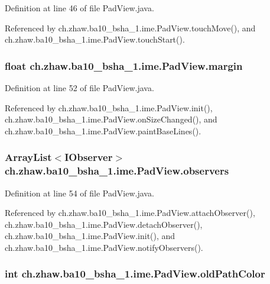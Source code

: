 Definition at line 46 of file PadView.java.

Referenced by ch.zhaw.ba10\_\-bsha\_\-1.ime.PadView.touchMove(), and ch.zhaw.ba10\_\-bsha\_\-1.ime.PadView.touchStart().\hypertarget{classch_1_1zhaw_1_1ba10__bsha__1_1_1ime_1_1PadView_af25e748299c5bc4816c615f180306695}{
\subsubsection[{margin}]{\setlength{\rightskip}{0pt plus 5cm}float {\bf ch.zhaw.ba10\_\-bsha\_\-1.ime.PadView.margin}}}
\label{classch_1_1zhaw_1_1ba10__bsha__1_1_1ime_1_1PadView_af25e748299c5bc4816c615f180306695}


Definition at line 52 of file PadView.java.

Referenced by ch.zhaw.ba10\_\-bsha\_\-1.ime.PadView.init(), ch.zhaw.ba10\_\-bsha\_\-1.ime.PadView.onSizeChanged(), and ch.zhaw.ba10\_\-bsha\_\-1.ime.PadView.paintBaseLines().\hypertarget{classch_1_1zhaw_1_1ba10__bsha__1_1_1ime_1_1PadView_acb98feb9db4b3995ee755d986679428d}{
\subsubsection[{observers}]{\setlength{\rightskip}{0pt plus 5cm}ArrayList$<${\bf IObserver}$>$ {\bf ch.zhaw.ba10\_\-bsha\_\-1.ime.PadView.observers}}}
\label{classch_1_1zhaw_1_1ba10__bsha__1_1_1ime_1_1PadView_acb98feb9db4b3995ee755d986679428d}


Definition at line 54 of file PadView.java.

Referenced by ch.zhaw.ba10\_\-bsha\_\-1.ime.PadView.attachObserver(), ch.zhaw.ba10\_\-bsha\_\-1.ime.PadView.detachObserver(), ch.zhaw.ba10\_\-bsha\_\-1.ime.PadView.init(), and ch.zhaw.ba10\_\-bsha\_\-1.ime.PadView.notifyObservers().\hypertarget{classch_1_1zhaw_1_1ba10__bsha__1_1_1ime_1_1PadView_ac399fffb0a2e777ca6089ad4e713e76c}{
\subsubsection[{oldPathColor}]{\setlength{\rightskip}{0pt plus 5cm}int {\bf ch.zhaw.ba10\_\-bsha\_\-1.ime.PadView.oldPathColor}}}
\label{classch_1_1zhaw_1_1ba10__bsha__1_1_1ime_1_1PadView_ac399fffb0a2e777ca6089ad4e713e76c}


